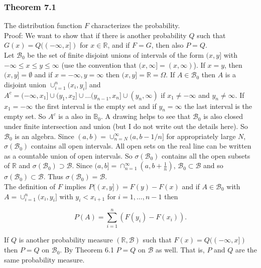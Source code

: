 \documentclass{article}
\begin{document}
{\subsubsection*{Theorem 7.1}

The distribution function $F$ characterizes the probability. \\

Proof: We want to show that if there is another probability $Q$ such that $G(x) = Q((-\infty, x])$ for $x \in \mathbb{R}$, and if $F = G$, then also $P = Q$. \\

Let $\mathcal{B}_0$ be the set of finite disjoint unions of intervals of the form $(x,y]$ with $-\infty \leq x \leq y \leq \infty$ (use the convention that $(x,\infty] = (x,\infty)$). If $x = y$, then $(x,y] = \emptyset$ and if $x = -\infty, y = \infty$ then $(x,y] = \mathbb{R} = \Omega$. If $A \in \mathcal{B}_0$ then $A$ is a disjoint union $\cup_{i=1}^n (x_i, y_i]$ and $A^c = (-\infty, x_1] \cup (y_1, x_2] \cup \dots (y_{n-1}, x_n] \cup (y_n, \infty)$ if $x_1 \neq -\infty$ and $y_n \neq \infty$. If $x_1 = -\infty$ the first interval is the empty set and if $y_n = \infty$ the last interval is the empty set. So $A^c$ is a also in $\mathbb{B}_0$. A drawing helps to see that $\mathcal{B}_0$ is also closed under finite intersection and union (but I do not write out the details here). So $\mathcal{B}_0$ is an algebra. Since $(a,b) = \cup_{n=N}^\infty (a, b - 1/n]$ for appropriately large $N$, $\sigma(\mathcal{B}_0)$ contains all open intervals. All open sets on the real line can be written as a countable union of open intervals. So $\sigma(\mathcal{B}_0)$ contains all the open subsets of $\mathbb{R}$ and $\sigma(\mathcal{B}_0) \supset \mathcal{B}$. Since $(a,b] = \cap_{n=1}^\infty (a, b+\frac{1}{n})$, $\mathcal{B}_0 \subset \mathcal{B}$ and so $\sigma(\mathcal{B}_0) \subset \mathcal{B}$. Thus $\sigma(\mathcal{B}_0) = \mathcal{B}$. \\

The definition of $F$ implies $P((x,y]) = F(y) - F(x)$ and if $A \in \mathcal{B}_0$ with $A = \cup_{i=1}^n (x_i, y_i]$ with $y_i < x_{i+1}$ for $i=1,\dots , n-1$ then

$$
P(A) = \sum_{i=1}^n (F(y_i) - F(x_i)).
$$

If $Q$ is another probability measure $(\mathbb{R},\mathcal{B})$ such that $F(x) = Q((-\infty,x])$ then $P = Q$ on $\mathcal{B}_0$. By Theorem 6.1 $P = Q$ on $\mathcal{B}$ as well. That is, $P$ and $Q$ are the same probability measure. 

}
\end{document}
